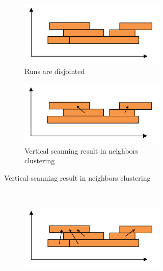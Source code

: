 \begin{figure}
	\centering
	\begin{subfigure}{\linewidth}
		\centering
		\begin{subfigure}{0.4\linewidth}
			\includegraphics[width=\linewidth]{../Images/c2/RLE1}
			\caption{Runs are disjointed}
			\label{fig:RLE1}
		\end{subfigure}
		\begin{subfigure}{0.4\linewidth}
			\includegraphics[width=\linewidth]{../Images/c2/RLE2}
			\caption{Vertical scanning result in neighbors clustering}
			\label{fig:RLE2}
		\end{subfigure}
	\end{subfigure}
	~
	\begin{subfigure}{\linewidth}
		\centering
   		\begin{subfigure}{0.4\linewidth}
   			\includegraphics[width=\linewidth]{../Images/c2/RLE3}

\end{subfigure}
\end{subfigure}
\end{figure}

